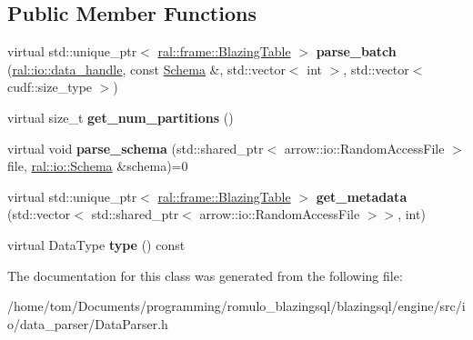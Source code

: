 \subsection*{Public Member Functions}
\begin{DoxyCompactItemize}
\item 
\mbox{\label{classral_1_1io_1_1data__parser_a0c91feb81678403e9fd44076869c8ea2}} 
virtual std\+::unique\+\_\+ptr$<$ \hyperlink{classral_1_1frame_1_1BlazingTable}{ral\+::frame\+::\+Blazing\+Table} $>$ {\bfseries parse\+\_\+batch} (\hyperlink{structral_1_1io_1_1data__handle}{ral\+::io\+::data\+\_\+handle}, const \hyperlink{classral_1_1io_1_1Schema}{Schema} \&, std\+::vector$<$ int $>$, std\+::vector$<$ cudf\+::size\+\_\+type $>$)
\item 
\mbox{\label{classral_1_1io_1_1data__parser_abdb1c7acce3b3ad154252a94053921bb}} 
virtual size\+\_\+t {\bfseries get\+\_\+num\+\_\+partitions} ()
\item 
\mbox{\label{classral_1_1io_1_1data__parser_a00beeb22738fcb9f3027ca01480fec99}} 
virtual void {\bfseries parse\+\_\+schema} (std\+::shared\+\_\+ptr$<$ arrow\+::io\+::\+Random\+Access\+File $>$ file, \hyperlink{classral_1_1io_1_1Schema}{ral\+::io\+::\+Schema} \&schema)=0
\item 
\mbox{\label{classral_1_1io_1_1data__parser_a3baa7b548a8709c3604a4164c2a747d0}} 
virtual std\+::unique\+\_\+ptr$<$ \hyperlink{classral_1_1frame_1_1BlazingTable}{ral\+::frame\+::\+Blazing\+Table} $>$ {\bfseries get\+\_\+metadata} (std\+::vector$<$ std\+::shared\+\_\+ptr$<$ arrow\+::io\+::\+Random\+Access\+File $>$$>$, int)
\item 
\mbox{\label{classral_1_1io_1_1data__parser_adb75d2db677272a1d26ab29bfd5dd954}} 
virtual Data\+Type {\bfseries type} () const
\end{DoxyCompactItemize}


The documentation for this class was generated from the following file\+:\begin{DoxyCompactItemize}
\item 
/home/tom/\+Documents/programming/romulo\+\_\+blazingsql/blazingsql/engine/src/io/data\+\_\+parser/Data\+Parser.\+h\end{DoxyCompactItemize}
